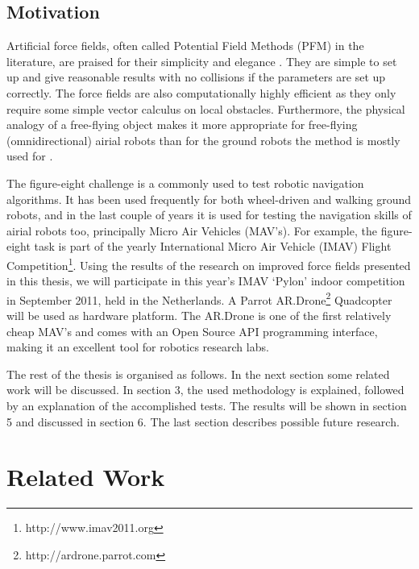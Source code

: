 \documentclass[11pt]{article}
\begin{document}
\subsection{Motivation}
\label{sec:motivation}


Artificial force fields, often called Potential Field Methods (PFM) in the literature, are praised for their simplicity and elegance \cite{koren}. They are simple to set up and give reasonable results with no collisions if the parameters are set up correctly. The force fields are also computationally highly efficient as they only require some simple vector calculus on local obstacles. Furthermore, the physical analogy of a free-flying object makes it more appropriate for free-flying (omnidirectional) airial robots than for the ground robots the method is mostly used for \cite{burgard99}. %

The figure-eight challenge is a commonly used to test robotic navigation algorithms. %
It has been used frequently for both wheel-driven and walking ground robots, and in the last couple of years it is used for testing the navigation skills of airial robots too, principally Micro Air Vehicles (MAV's). For example, the figure-eight task is part of the yearly International Micro Air Vehicle (IMAV) Flight Competition\footnote{http://www.imav2011.org}. Using the results of the research on improved force fields presented in this thesis, we will participate in this year's IMAV `Pylon' indoor competition in September 2011, held in the Netherlands. A Parrot AR.Drone\footnote{http://ardrone.parrot.com} Quadcopter will be used as hardware platform. The AR.Drone is one of the first relatively cheap MAV's and comes with an Open Source API programming interface, making it an excellent tool for robotics research labs.

The rest of the thesis is organised as follows. In the next section some related work will be discussed. In section 3, the used methodology is explained, followed by an explanation of the accomplished tests. The results will be shown in section 5 and discussed in section 6. The last section describes possible future research.


\section{Related Work}
\label{sec:related}
\end{document}
